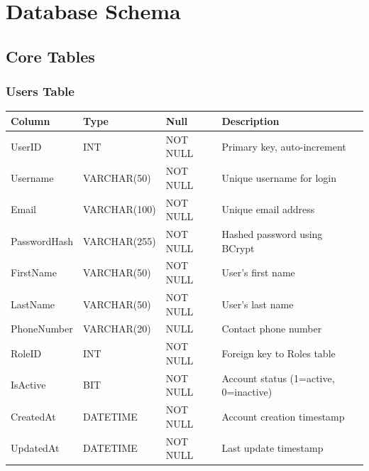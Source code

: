 \documentclass[12pt,a4paper]{article}
\begin{document}
\newpage

\section{Database Schema}

\subsection{Core Tables}

\subsubsection{Users Table}
\begin{longtable}{|p{3cm}|p{2cm}|p{2cm}|p{7cm}|}
\hline
\textbf{Column} & \textbf{Type} & \textbf{Null} & \textbf{Description} \\
\hline
UserID & INT & NOT NULL & Primary key, auto-increment \\
\hline
Username & VARCHAR(50) & NOT NULL & Unique username for login \\
\hline
Email & VARCHAR(100) & NOT NULL & Unique email address \\
\hline
PasswordHash & VARCHAR(255) & NOT NULL & Hashed password using BCrypt \\
\hline
FirstName & VARCHAR(50) & NOT NULL & User's first name \\
\hline
LastName & VARCHAR(50) & NOT NULL & User's last name \\
\hline
PhoneNumber & VARCHAR(20) & NULL & Contact phone number \\
\hline
RoleID & INT & NOT NULL & Foreign key to Roles table \\
\hline
IsActive & BIT & NOT NULL & Account status (1=active, 0=inactive) \\
\hline
CreatedAt & DATETIME & NOT NULL & Account creation timestamp \\
\hline
UpdatedAt & DATETIME & NOT NULL & Last update timestamp \\
\hline
\end{longtable}
\end{document}

